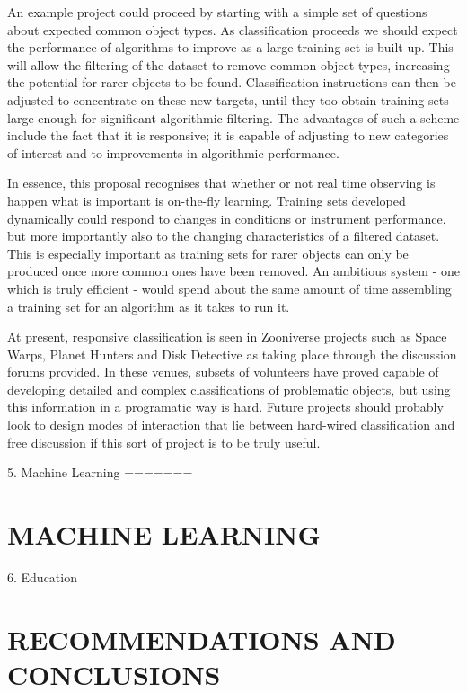 \documentclass{pasa}
\begin{document}
An example project could proceed by starting with a simple set of questions about expected common object types. As classification proceeds we should expect the performance of algorithms to improve as a large training set is built up. This will allow the filtering of the dataset to remove common object types, increasing the potential for rarer objects to be found. Classification instructions can then be adjusted to concentrate on these new targets, until they too obtain training sets large enough for significant algorithmic filtering. The advantages of such a scheme include the fact that it is responsive; it is capable of adjusting to new categories of interest and to improvements in algorithmic performance. 

In essence, this proposal recognises that whether or not real time observing is happen what is important is on-the-fly learning. Training sets developed dynamically could respond to changes in conditions or instrument performance, but more importantly also to the changing characteristics of a filtered dataset. This is especially important as training sets for rarer objects can only be produced once more common ones have been removed. An ambitious system - one which is truly efficient - would spend about the same amount of time assembling a training set for an algorithm as it takes to run it. 

At present, responsive classification is seen in Zooniverse projects such as Space Warps, Planet Hunters and Disk Detective as taking place through the discussion forums provided. In these venues, subsets of volunteers have proved capable of developing detailed and complex classifications of problematic objects, but using this information in a programatic way is hard. Future projects should probably look to design modes of interaction that lie between hard-wired classification and free discussion if this sort of project is to be truly useful. 


5. Machine Learning
=======
\section{MACHINE LEARNING}
\label{sec:ml}

6. Education

\section{RECOMMENDATIONS AND CONCLUSIONS}
\label{sec:conclusions}
\end{document}

